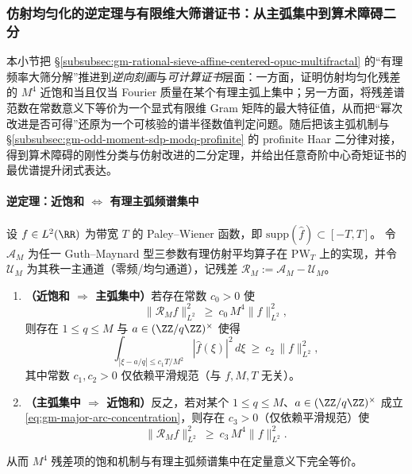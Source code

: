 \subsubsection{仿射均匀化的逆定理与有限维大筛谱证书：从主弧集中到算术障碍二分}\label{subsubsec:gm-affine-inverse-gram-arithmetic-dichotomy}
本小节把 \S\ref{subsubsec:gm-rational-sieve-affine-centered-opuc-multifractal} 的“有理频率大筛分解”推进到\emph{逆向刻画}与\emph{可计算证书}层面：一方面，证明仿射均匀化残差的 \(M^4\) 近饱和当且仅当 Fourier 质量在某个有理主弧上集中；另一方面，将残差谱范数在常数意义下等价为一个显式有限维 Gram 矩阵的最大特征值，从而把“幂次改进是否可得”还原为一个可核验的谱半径数值判定问题。随后把该主弧机制与 \S\ref{subsubsec:gm-odd-moment-sdp-modq-profinite} 的 profinite Haar 二分律对接，得到算术障碍的刚性分类与仿射改进的二分定理，并给出任意奇阶中心奇矩证书的最优谱提升闭式表达。

\paragraph{逆定理：近饱和 \texorpdfstring{$\Longleftrightarrow$}{<->} 有理主弧频谱集中}
\begin{theorem}\label{thm:gm-affine-inverse-major-arc}
设 \(f\in L^2(\RR)\) 为带宽 \(T\) 的 Paley--Wiener 函数，即 \(\mathrm{supp}(\widehat f)\subset[-T,T]\)。
令 \(\mathcal{A}_M\) 为任一 Guth--Maynard 型三参数有理仿射平均算子在 \(\mathrm{PW}_T\) 上的实现，并令 \(\mathcal{U}_M\) 为其秩一主通道（零频/均匀通道），记残差 \(\mathcal{R}_M:=\mathcal{A}_M-\mathcal{U}_M\)。
\begin{enumerate}
  \item \textbf{（近饱和 \(\Rightarrow\) 主弧集中）}若存在常数 \(c_0>0\) 使
  \[
  \|\mathcal{R}_M f\|_{L^2}^2\ \ge\ c_0\,M^{4}\|f\|_{L^2}^2,
  \]
  则存在 \(1\le q\le M\) 与 \(a\in(\ZZ/q\ZZ)^\times\) 使得
  \begin{equation}\label{eq:gm-major-arc-concentration}
  \int_{|\xi-a/q|\le c_1T/M^{2}} |\widehat f(\xi)|^2\,d\xi\ \ge\ c_2\,\|f\|_{L^2}^2,
  \end{equation}
  其中常数 \(c_1,c_2>0\) 仅依赖平滑规范（与 \(f,M,T\) 无关）。
  \item \textbf{（主弧集中 \(\Rightarrow\) 近饱和）}反之，若对某个 \(1\le q\le M\)、\(a\in(\ZZ/q\ZZ)^\times\) 成立 \eqref{eq:gm-major-arc-concentration}，则存在 \(c_3>0\)（仅依赖平滑规范）使
  \[
  \|\mathcal{R}_M f\|_{L^2}^2\ \ge\ c_3\,M^{4}\|f\|_{L^2}^2.
  \]
\end{enumerate}
从而 \(M^4\) 残差项的饱和机制与有理主弧频谱集中在定量意义下完全等价。
\end{theorem}

